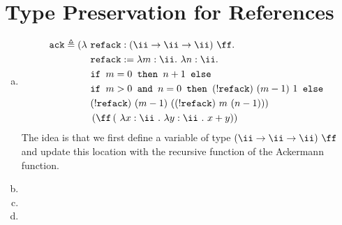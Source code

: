 \section{Type Preservation for References}

\begin{enumerate}[(a)]
\item
\begin{align*}
\texttt{ack} \triangleq ( \lambda ~ &\texttt{refack}:(\ii \rightarrow \ii \rightarrow \ii) ~ \ff .\\
&\texttt{refack} := \lambda m : \ii. ~ \lambda n : \ii . ~ \\
&\texttt{if } m = 0 \texttt{ then } n+1 \texttt{ else}\\
&\texttt{if } m>0 \texttt{ and } n = 0 \texttt{ then } (!\texttt{refack}) ~ (m-1) ~1 \texttt{ else } \\
&(!\texttt{refack}) ~ (m-1) ~ ((!\texttt{refack}) ~ m ~ (n-1)) ) \\
&\left ( \ff \left ( ~ \lambda x : \ii~.~\lambda y : \ii~.~ x+ y \right ) \right )
\end{align*}
The idea is that we first define a variable of type $(\ii \rightarrow \ii \rightarrow \ii) ~ \ff$ and update this location with the recursive function of the Ackermann function.
\item
\item
\item
\end{enumerate}
